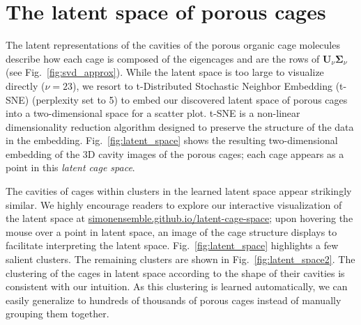 \documentclass[journal=jacsat,manuscript=article,layout=traditional]{achemso}
\begin{document}
\section{The latent space of porous cages} The latent representations of the cavities of the porous organic cage molecules describe how each cage is composed of the eigencages and are the rows of $\mathbf{U}_\nu \mathbf{\Sigma}_\nu$ (see Fig.~\ref{fig:svd_approx}). While the latent space is too large to visualize directly ($\nu=23$), we resort to t-Distributed Stochastic Neighbor Embedding (t-SNE) \cite{maaten2008visualizing,wattenberg2016how} (perplexity set to 5) to embed our discovered latent space of porous cages into a two-dimensional space for a scatter plot. t-SNE is a non-linear dimensionality reduction algorithm designed to preserve the structure of the data in the embedding. Fig.~\ref{fig:latent_space} shows the resulting two-dimensional embedding of the 3D cavity images of the porous cages; each cage appears as a point in this \emph{latent cage space}. 

The cavities of cages within clusters in the learned latent space appear strikingly similar.
We highly encourage readers to explore our interactive visualization of the latent space at \url{simonensemble.github.io/latent-cage-space}; upon hovering the mouse over a point in latent space, an image of the cage structure displays to facilitate interpreting the latent space. Fig.~\ref{fig:latent_space} highlights a few salient clusters. The remaining clusters are shown in Fig.~\ref{fig:latent_space2}. The clustering of the cages in latent space according to the shape of their cavities is consistent with our intuition. As this clustering is learned automatically, we can easily generalize to hundreds of thousands of porous cages instead of manually grouping them together. 
\end{document}
